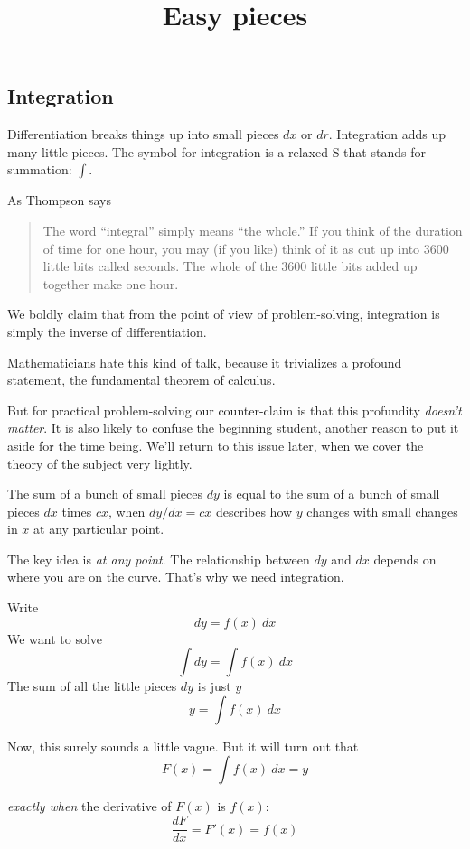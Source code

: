 \documentclass[11pt, oneside]{article}
\title{Easy pieces}
\date{}
\begin{document}
\maketitle
\Large


\subsection*{Integration}
Differentiation breaks things up into small pieces $dx$ or $dr$.  Integration adds up many little pieces.  The symbol for integration is a relaxed S that stands for summation:  $\int$.

As Thompson says
\begin{quote}The word “integral” simply means “the whole.” If you think of the duration of time for one hour, you may (if you like) think of it as cut up into 3600 little bits called seconds. The whole of the 3600 little bits added up together make one hour.\end{quote}

We boldly claim that from the point of view of problem-solving, integration is simply the inverse of differentiation.  

Mathematicians hate this kind of talk, because it trivializes a profound statement, the fundamental theorem of calculus.  

But for practical problem-solving our counter-claim is that this profundity \emph{doesn't matter}.  It is also likely to confuse the beginning student, another reason to put it aside for the time being.  We'll return to this issue later, when we cover the theory of the subject very lightly.

The sum of a bunch of small pieces $dy$ is equal to the sum of a bunch of small pieces $dx$ times $cx$, when $dy/dx= cx$ describes how $y$ changes with small changes in $x$ at any particular point. 

The key idea is \emph{at any point}.  The relationship between $dy$ and $dx$ depends on where you are on the curve.  That's why we need integration.

Write
\[ dy =  f(x) \ dx \]
We want to solve
\[ \int dy = \int f(x) \ dx \]
The sum of all the little pieces $dy$ is just $y$
\[ y = \int f(x) \ dx \]

Now, this surely sounds a little vague.  But it will turn out that
\[ F(x) =  \int f(x) \ dx = y \]

\emph{exactly when} the derivative of $F(x)$ is $f(x)$:
\[ \frac{dF}{dx} = F'(x) = f(x) \]
\end{document}

